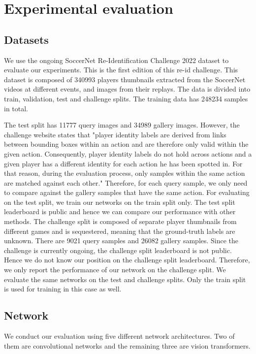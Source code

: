 \documentclass{article}
\begin{document}
\section{Experimental evaluation}
\label{sec:evaluation}
\subsection{Datasets}
\label{sec:datasets}

We use the ongoing SoccerNet Re-Identification Challenge 2022 dataset \cite{soccerNetv3, soccerNetv2} to evaluate our experiments. This is the first edition of this re-id challenge. This dataset is composed of 340993 players thumbnails extracted from the SoccerNet videos at different events, and images from their replays. The data is divided into train, validation, test and challenge splits. The training data has 248234 samples in total. 

The test split has 11777 query images and 34989 gallery images. However, the challenge website \cite{soccerNetv3} states that "player identity labels are derived from links between bounding boxes within an action and are therefore only valid within the given action. Consequently, player identity labels do not hold across actions and a given player has a different identity for each action he has been spotted in. For that reason, during the evaluation process, only samples within the same action are matched against each other." Therefore, for each query sample, we only need to compare against the gallery samples that have the same action. For evaluating on the test split, we train our networks on the train split only. The test split leaderboard is public and hence we can compare our performance with other methods.
The challenge split is composed of separate player thumbnails from different games and is sequestered, meaning that the ground-truth labels are unknown. There are 9021 query samples and 26082 gallery samples. Since the challenge is currently ongoing, the challenge split leaderboard is not public. Hence we do not know our position on the challenge split leaderboard. Therefore, we only report the performance of our network on the challenge split. We evaluate the same networks on the test and challenge splits. Only the train split is used for training in this case as well.

\subsection{Network}
\label{sec:network}
We conduct our evaluation using five different network architectures. Two of them are convolutional networks and the remaining three are vision transformers.
\end{document}
